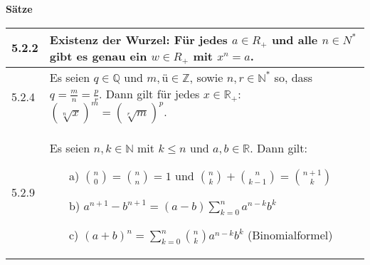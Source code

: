 \noindent
\textbf{Sätze}
\begin{table}[H]
\begin{tabularx}{\textwidth}{X m{16cm}}
    \toprule

    5.2.2 & \textbf{Existenz der Wurzel:} \hfill \break 
            Für jedes $a \in R_+$ und alle $n \in N^*$ gibt es genau ein $w \in R_+$ mit $x^n = a$. \\
    \midrule
    5.2.4 & Es seien $q \in \mathbb{Q}$ und $m,ü \in \mathbb{Z}$, sowie $n,r \in \mathbb{N^*}$ so, dass
            $q = \frac{m}{n} = \frac{p}{r}$. \hfill \break
            Dann gilt für jedes $x \in \mathbb{R_+}$: $(\sqrt[n]{x})^m = (\sqrt[r]{m})^p$. \\
    \midrule
    5.2.9 & Es seien $n,k \in \mathbb{N}$ mit $k \leq n$ und $a,b \in \mathbb{R}$. Dann gilt:
            \begin{itemize}[topsep=-0.5cm]
                \item[a)] $\binom{n}{0} = \binom{n}{n} = 1$ und $\binom{n}{k} + \binom{n}{k-1} = \binom{n+1}{k}$
                \item[b)] $a^{n+1} - b^{n+1} = (a-b) \sum^n_{k=0}a^{n-k}b^k$
                \item[c)] $(a+b)^n = \sum^n_{k=0} \binom{n}{k} a^{n-k}b^k$ (Binomialformel)  
            \end{itemize} \vspace{-0cm} \\
    

    \bottomrule
\end{tabularx}
\end{table}

